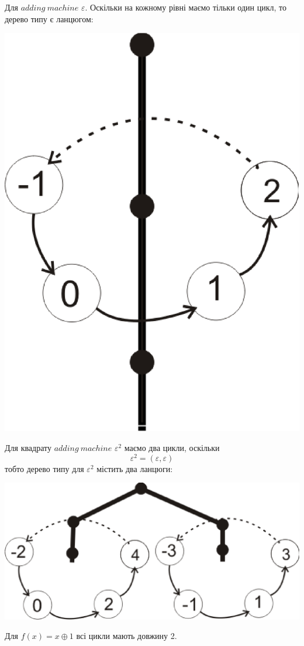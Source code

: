 \documentclass[a4paper,12pt]{article} \usepackage{a4wide}
\numberwithin{equation}{subsection}
\begin{document}
 Для $adding \ machine$ $\varepsilon$.
  Оскільки на кожному рівні маємо тільки один цикл, то дерево типу є ланцюгом:
\begin{center}
\includegraphics[scale=0.3]{AMgraph.eps}
\end{center}
 Для квадрату $adding \ machine$ $\varepsilon^2$ маємо два цикли, оскільки $$\varepsilon^2=(\varepsilon,\varepsilon)$$
 тобто дерево типу для $\varepsilon^2$ містить два ланцюги:
\begin{center}
\includegraphics[scale=0.6]{Gr(x+2).eps}
\end{center}
Для $f(x)=x\oplus 1$ всі цикли мають довжину 2.
\end{document}
